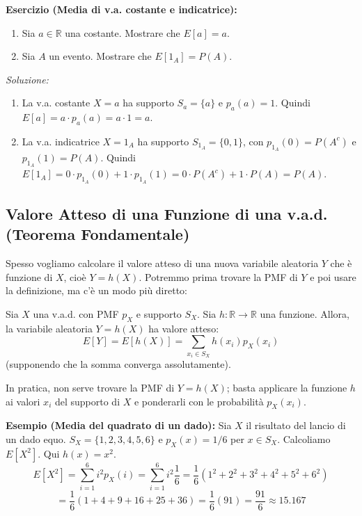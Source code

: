 \begin{example}
\textbf{Esercizio (Media di v.a. costante e indicatrice):}
\begin{enumerate}
    \item Sia $a \in \mathbb{R}$ una costante. Mostrare che $E[a] = a$.
    \item Sia $A$ un evento. Mostrare che $E[1_A] = P(A)$.
\end{enumerate}
\textit{Soluzione:}
\begin{enumerate}
    \item La v.a. costante $X=a$ ha supporto $S_a=\{a\}$ e $p_a(a)=1$.
    Quindi $E[a] = a \cdot p_a(a) = a \cdot 1 = a$.
    \item La v.a. indicatrice $X=1_A$ ha supporto $S_{1_A}=\{0,1\}$, con $p_{1_A}(0)=P(A^c)$ e $p_{1_A}(1)=P(A)$.
    Quindi $E[1_A] = 0 \cdot p_{1_A}(0) + 1 \cdot p_{1_A}(1) = 0 \cdot P(A^c) + 1 \cdot P(A) = P(A)$.
\end{enumerate}
\end{example}

\subsection{Valore Atteso di una Funzione di una v.a.d. (Teorema Fondamentale)}
Spesso vogliamo calcolare il valore atteso di una nuova variabile aleatoria $Y$ che è funzione di $X$, cioè $Y=h(X)$. Potremmo prima trovare la PMF di $Y$ e poi usare la definizione, ma c'è un modo più diretto:

\begin{theorem}
Sia $X$ una v.a.d. con PMF $p_X$ e supporto $S_X$. Sia $h: \mathbb{R} \to \mathbb{R}$ una funzione. Allora, la variabile aleatoria $Y=h(X)$ ha valore atteso:
\[ E[Y] = E[h(X)] = \sum_{x_i \in S_X} h(x_i) p_X(x_i) \]
(supponendo che la somma converga assolutamente).
\end{theorem}
In pratica, non serve trovare la PMF di $Y=h(X)$; basta applicare la funzione $h$ ai valori $x_i$ del supporto di $X$ e ponderarli con le probabilità $p_X(x_i)$.

\begin{example}
\textbf{Esempio (Media del quadrato di un dado):}
Sia $X$ il risultato del lancio di un dado equo. $S_X=\{1,2,3,4,5,6\}$ e $p_X(x)=1/6$ per $x \in S_X$.
Calcoliamo $E[X^2]$. Qui $h(x)=x^2$.
\[ E[X^2] = \sum_{i=1}^6 i^2 p_X(i) = \sum_{i=1}^6 i^2 \frac{1}{6} = \frac{1}{6} (1^2+2^2+3^2+4^2+5^2+6^2) \]
\[ = \frac{1}{6} (1+4+9+16+25+36) = \frac{1}{6} (91) = \frac{91}{6} \approx 15.167 \]
\end{example}

